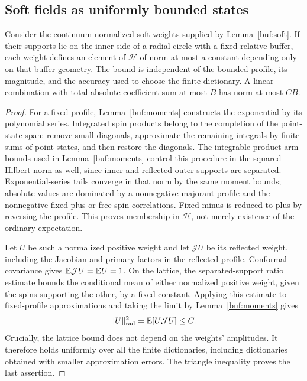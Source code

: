 \subsection{Soft fields as uniformly bounded states}

\begin{lemma}
\label{rad:soft-norm}
Consider the continuum normalized soft weights supplied by
Lemma~\ref{buf:soft}.  If their supports lie on the inner side of a
radial circle with a fixed relative buffer, each weight defines an
element of $\mathcal H$ of norm at most a constant depending only
on that buffer geometry.  The bound is independent of the bounded
profile, its magnitude, and the accuracy used to choose the finite
dictionary.  A linear combination with total absolute coefficient
sum at most $B$ has norm at most $CB$.
\end{lemma}

\begin{proof}
For a fixed profile, Lemma~\ref{buf:moments} constructs the
exponential by its polynomial series.  Integrated spin products
belong to the completion of the point-state span: remove small
diagonals, approximate the remaining integrals by finite sums of
point states, and then restore the diagonals.  The integrable
product-arm bounds used in Lemma~\ref{buf:moments} control this
procedure in the squared Hilbert norm as well, since inner and
reflected outer supports are separated.  Exponential-series tails
converge in that norm by the same moment bounds; absolute values
are dominated by a nonnegative majorant profile and the
nonnegative fixed-plus or free spin correlations.  Fixed minus is
reduced to plus by reversing the profile.  This proves membership
in $\mathcal H$, not merely existence of the ordinary expectation.

Let $U$ be such a normalized positive weight and let $\mathcal JU$
be its reflected weight, including the Jacobian and primary
factors in the reflected profile.  Conformal covariance gives
$\mathbb E\mathcal JU=\mathbb E U=1$.  On the lattice, the separated-support
ratio estimate bounds the conditional mean of either normalized
positive weight, given the spins supporting the other, by a fixed
constant.  Applying this estimate to fixed-profile approximations
and taking the limit by Lemma~\ref{buf:moments} gives
\[
                  \|U\|_{\rm rad}^2=\mathbb E[U\mathcal JU]\leq C.
\]
Crucially, the lattice bound does not depend on the weights'
amplitudes.  It therefore holds uniformly over all the finite
dictionaries, including dictionaries obtained with smaller
approximation errors.  The triangle inequality proves the last
assertion.
\end{proof}

